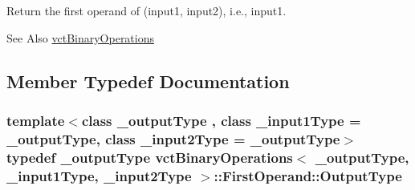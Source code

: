 Return the first operand of (input1, input2), i.\-e., input1. 

\begin{DoxySeeAlso}{See Also}
\hyperlink{classvct_binary_operations}{vct\-Binary\-Operations} 
\end{DoxySeeAlso}


\subsection{Member Typedef Documentation}
\hypertarget{classvct_binary_operations_1_1_first_operand_a236847584897a5c19908da9440b730f2}{
\subsubsection[{Output\-Type}]{\setlength{\rightskip}{0pt plus 5cm}template$<$class \-\_\-output\-Type , class \-\_\-input1\-Type  = \-\_\-output\-Type, class \-\_\-input2\-Type  = \-\_\-output\-Type$>$ typedef \-\_\-output\-Type {\bf vct\-Binary\-Operations}$<$ \-\_\-output\-Type, \-\_\-input1\-Type, \-\_\-input2\-Type $>$\-::{\bf First\-Operand\-::\-Output\-Type}}}\label{classvct_binary_operations_1_1_first_operand_a236847584897a5c19908da9440b730f2}



